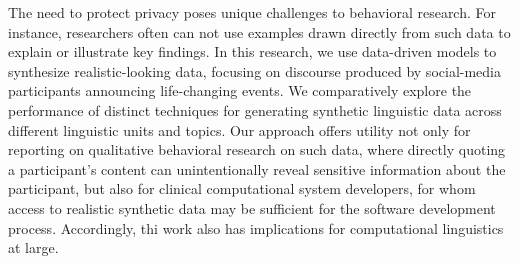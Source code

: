 The need to protect privacy poses unique challenges to behavioral research. For instance, researchers often can not use examples drawn directly from such data to explain or illustrate key findings. In this research, we use data-driven models to synthesize realistic-looking data, focusing on discourse produced by social-media participants announcing life-changing events. We comparatively explore the performance of distinct techniques for generating synthetic linguistic data across different linguistic units and topics. Our approach offers utility not only for reporting on qualitative behavioral research on such data, where directly quoting a participant's content can unintentionally reveal sensitive information about the participant, but also for clinical computational system developers, for whom access to realistic synthetic data may be sufficient for the software development process. Accordingly, thi work also has implications for computational linguistics at large.
